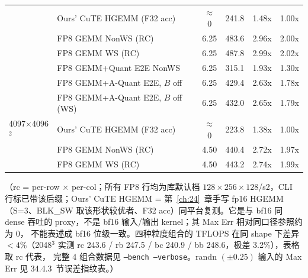 \begin{center}
\begin{tabular}{llcccc}
          & Ours' CuTE HGEMM (F32 acc)  & $\approx$0 & 241.8 & 1.48x & 1.00x \\
          & FP8 GEMM NonWS (RC)         & 6.25  & 483.6 & 2.96x & 2.00x \\
          & FP8 GEMM WS (RC)            & 6.25  & 487.8 & 2.99x & 2.02x \\
          & FP8 GEMM+Quant E2E NonWS    & 6.25  & 315.1 & 1.93x & 1.30x \\
          & FP8 GEMM+A-Quant E2E, $B$ off & 6.25 & 429.4 & 2.63x & 1.78x \\
          & FP8 GEMM+A-Quant E2E, $B$ off (WS) & 6.25 & 432.0 & 2.65x & 1.79x \\
\midrule
4097$\times$4096$^2$ & Ours' CuTE HGEMM (F32 acc) & $\approx$0 & 223.8 & 1.38x & 1.00x \\
                     & FP8 GEMM NonWS (RC) & 4.50 & 440.4 & 2.72x & 1.97x \\
                     & FP8 GEMM WS (RC)    & 4.50 & 443.2 & 2.74x & 1.99x \\
\bottomrule
\end{tabular}
\end{center}

（rc = per-row $\times$ per-col；所有 FP8 行均为库默认档
$128\times256\times128$/s2，CLI 行标已带该后缀；Ours' CuTE HGEMM = 第~\ref{ch:24}~章手写
fp16 HGEMM（S=3、BLK\_SW 取该形状较优者、F32 acc）同平台复测。它是与 bf16
同 dense 吞吐的 proxy，不是 bf16 输入/输出 kernel；其 Max Err 相对同口径参照约为 0，
不能表述成 bf16 位级一致。四种粒度组合的
TFLOPS 在同 shape 下差异 $<4\%$（2048$^3$ 实测 rc 243.6 / rb 247.5 /
bc 240.9 / bb 248.6，极差 3.2\%），表格取 rc 代表，
完整 4 组合数据见 \texttt{--bench --verbose}。randn $(\pm 0.25)$ 输入的
Max Err 见 34.4.3~节误差指纹表。）

